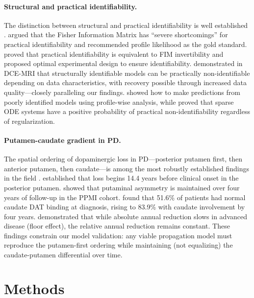 \paragraph{Structural and practical identifiability.}
The distinction between structural and practical identifiability is well established \cite{villaverde2016, raue2009}. \cite{wieland2021} argued that the Fisher Information Matrix has ``severe shortcomings'' for practical identifiability and recommended profile likelihood as the gold standard. \cite{wang2025} proved that practical identifiability is equivalent to FIM invertibility and proposed optimal experimental design to ensure identifiability. \cite{conte2024} demonstrated in DCE-MRI that structurally identifiable models can be practically non-identifiable depending on data characteristics, with recovery possible through increased data quality---closely paralleling our findings. \cite{simpson2024} showed how to make predictions from poorly identified models using profile-wise analysis, while \cite{casolo2025} proved that sparse ODE systems have a positive probability of practical non-identifiability regardless of regularization.

\paragraph{Putamen-caudate gradient in PD.}
The spatial ordering of dopaminergic loss in PD---posterior putamen first, then anterior putamen, then caudate---is among the most robustly established findings in the field \cite{kish1988, brooks1990}. \cite{kim2022} established that loss begins 14.4 years before clinical onset in the posterior putamen. \cite{fiorenzato2021} showed that putaminal asymmetry is maintained over four years of follow-up in the PPMI cohort. \cite{pasquini2019} found that 51.6\% of patients had normal caudate DAT binding at diagnosis, rising to 83.9\% with caudate involvement by four years. \cite{sung2016} demonstrated that while absolute annual reduction slows in advanced disease (floor effect), the relative annual reduction remains constant. These findings constrain our model validation: any viable propagation model must reproduce the putamen-first ordering while maintaining (not equalizing) the caudate-putamen differential over time.

\section{Methods}

